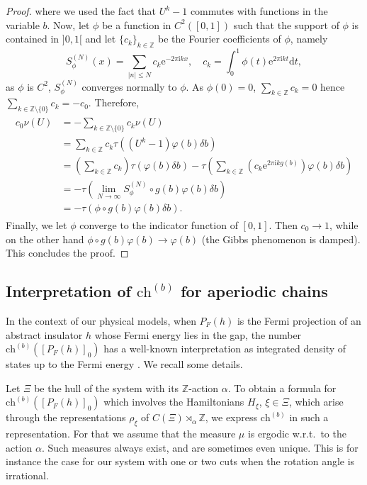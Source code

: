 \documentclass[11pt]{amsart}
\newcommand{\Z}{\mathbb{Z}}
\newcommand{\chb}{\text{ch}^{(b)}}
\begin{document}
\begin{proof}
	where we used the fact that $U^k-1$ commutes with functions in the variable $b$.
	Now, let $\phi$ be a function in $C^2([0,1])$ such that the support of $\phi$ is contained in $]0,1[$
	and let $\{c_k\}_{k\in \Z}$ be the Fourier coefficients of $\phi$, namely
	$$S_\phi^{(N)}(x)=\sum_{\lvert n\rvert \le N}c_k\mathrm{e}^{-2\pi\mathrm{i}kx}, \quad c_k=\int_0^1\phi(t)\mathrm{e}^{2\pi\mathrm{i}kt}\mathrm{d}t,$$
	as $\phi$  is $C^2$, $S_\phi^{(N)}$ converges normally to $\phi$. As $\phi(0)=0$,
	$\sum_{k\in\Z}c_k=0$ hence $\sum_{k\in\Z\setminus\{0\}}c_k=-c_0$.
	Therefore,
	\begin{align*}
		\begin{split}
			c_0\nu(U)&=-\sum_{k\in\Z\setminus\{0\}}c_k\nu(U)\\
			&= \sum_{k\in\Z}c_k \tau\left((U^k-1)\varphi(b)\delta b \right)\\
			&= \left(\sum_{k\in\Z}c_k\right) \tau\left(\varphi(b)\delta b \right)-  \tau\left(\sum_{k\in\Z}\left(c_k\mathrm{e}^{2\pi\mathrm{i}kg(b)}\right)\varphi(b)\delta b \right)\\
			&= -\tau\left(\lim_{N\rightarrow\infty} S_\phi^{(N)}\circ g (b)\varphi(b)\delta b\right)\\ 
			&= -\tau\left(\phi\circ g (b)\varphi(b)\delta b\right).
		\end{split}
	\end{align*}
	Finally, we let $\phi$ converge to the indicator function of $[0, 1]$. Then $c_0 \rightarrow 1$, while on the other hand $\phi\circ g (b)\varphi(b) \rightarrow\varphi(b)$ (the Gibbs phenomenon is damped). This concludes the proof.
\end{proof}
\subsection{Interpretation of $\chb$ for aperiodic chains}\label{sec-IDS}
In the context of our physical models, when $P_F(h)$ is the Fermi projection of an abstract insulator $h$ whose Fermi energy lies in the gap, the number $\chb([P_F(h)]_0)$ has a well-known interpretation as integrated density of states up to the Fermi energy \cite{Bellissard1992}. 
We recall some details.

Let $\Xi$ be the hull of the system with its $\Z$-action $\alpha$. 
To obtain a formula for $\chb([P_F(h)]_0)$ which involves the Hamiltonians $H_\xi$, $\xi\in\Xi$, which arise through the representations $\rho_\xi$ of $C(\Xi)\rtimes_\alpha\Z$, we express $\chb$ in such a representation. For that we assume that the measure $\mu$ is ergodic w.r.t.\ to the action $\alpha$. Such measures always exist, and are sometimes even unique. This is for instance the case for our system with one or two cuts when the rotation angle is irrational. 
\end{document}
